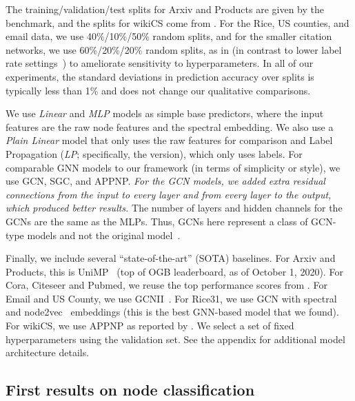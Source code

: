 \documentclass{article}
\newcommand{\xhdr}[1]{\vspace{0.0mm}\noindent{\textbf{#1.}}\hspace{0.5mm}}
\begin{document}
\xhdr{Data splits} The training/validation/test splits for Arxiv and Products are given by the benchmark,
and the splits for wikiCS come from \citet{Mernyei2020WikiCSAW}.
For the Rice, US counties, and email data, we use 40\%/10\%/50\% random splits,
and for the smaller citation networks, we use 60\%/20\%/20\% random splits, as in \citet{wang2020unifying} (in contrast to lower label rate settings~\citep{Yang2016RevisitingSL})
to ameliorate sensitivity to hyperparameters.
In all of our experiments, the standard deviations in prediction accuracy over splits is typically less than 1\% and does
not change our qualitative comparisons.

\xhdr{Base predictors and other models}
We use \emph{Linear} and \emph{MLP} models as simple base predictors,
where the input features are the raw node features and the spectral embedding.
We also use a \emph{Plain Linear} model that only uses the raw features for comparison
and Label Propagation (\emph{LP}; specifically, the \citet{zhou2004learning} version), which only uses labels.
For comparable GNN models to our framework (in terms of simplicity or style), we use GCN, SGC, and APPNP.
\emph{For the GCN models, we added extra residual connections from the input to every layer and from every layer to the output,
which produced better results.}
The number of layers and hidden channels for the GCNs are the same as the MLPs.
Thus, GCNs here represent a class of GCN-type models and not the original model~\cite{kipf2017semi}.

Finally, we include several ``state-of-the-art'' (SOTA) baselines.
For Arxiv and Products, this is UniMP~\citep{shi2020masked} (top of OGB leaderboard, as of October 1, 2020).
For Cora, Citeseer and Pubmed, we reuse the top performance scores from \citet{chen2020simple}.
For Email and US County, we use GCNII~\citep{chen2020simple}. 
For Rice31, we use GCN with spectral and node2vec~\citep{Grover2016node2vecSF} embeddings (this is the best GNN-based model that we found).
For wikiCS, we use APPNP as reported by \citet{Mernyei2020WikiCSAW}.
We select a set of fixed hyperparameters using the validation set.
See the appendix for additional model architecture details.


\subsection{First results on node classification}
\end{document}
